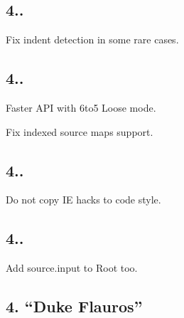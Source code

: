 \subsection*{4..}


\begin{DoxyItemize}
\item Fix indent detection in some rare cases.
\end{DoxyItemize}

\subsection*{4..}


\begin{DoxyItemize}
\item Faster A\+PI with 6to5 Loose mode.
\item Fix indexed source maps support.
\end{DoxyItemize}

\subsection*{4..}


\begin{DoxyItemize}
\item Do not copy IE hacks to code style.
\end{DoxyItemize}

\subsection*{4..}


\begin{DoxyItemize}
\item Add {\ttfamily source.\+input} to {\ttfamily Root} too.
\end{DoxyItemize}

\subsection*{4. “\+Duke Flauros”}


